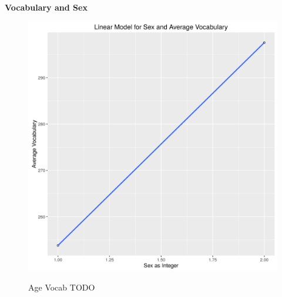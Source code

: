 \documentclass[11pt]{article}  %
\begin{document}
\textbf{Vocabulary and Sex}
\begin{figure}[h]
\centering
\caption{Age Vocab TODO}
\includegraphics[scale=.50]{means_sex}
\label{}
\end{figure}





\end{document}
